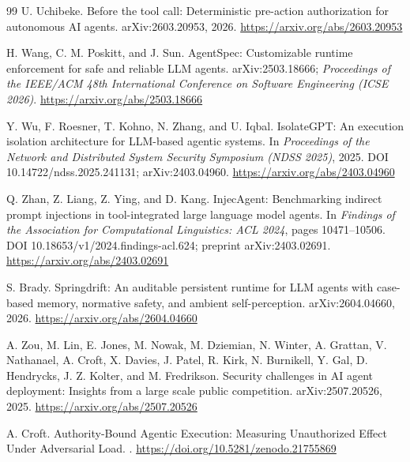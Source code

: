 \documentclass[11pt,letterpaper]{article}
\begin{document}
\begin{thebibliography}{99}
U. Uchibeke.
\newblock Before the tool call: Deterministic pre-action authorization for autonomous AI agents.
\newblock arXiv:2603.20953, 2026. \url{https://arxiv.org/abs/2603.20953}
\newblock [Preprint.]

H. Wang, C. M. Poskitt, and J. Sun.
\newblock AgentSpec: Customizable runtime enforcement for safe and reliable LLM agents.
\newblock arXiv:2503.18666; \emph{Proceedings of the IEEE/ACM 48th International Conference on Software Engineering (ICSE 2026)}.
\newblock \url{https://arxiv.org/abs/2503.18666}

Y. Wu, F. Roesner, T. Kohno, N. Zhang, and U. Iqbal.
\newblock IsolateGPT: An execution isolation architecture for LLM-based agentic systems.
\newblock In \emph{Proceedings of the Network and Distributed System Security Symposium (NDSS 2025)}, 2025.
\newblock DOI 10.14722/ndss.2025.241131; arXiv:2403.04960. \url{https://arxiv.org/abs/2403.04960}

Q. Zhan, Z. Liang, Z. Ying, and D. Kang.
\newblock InjecAgent: Benchmarking indirect prompt injections in tool-integrated large language model agents.
\newblock In \emph{Findings of the Association for Computational Linguistics: ACL 2024}, pages 10471--10506.
\newblock DOI 10.18653/v1/2024.findings-acl.624; preprint arXiv:2403.02691.
\newblock \url{https://arxiv.org/abs/2403.02691}

S. Brady.
\newblock Springdrift: An auditable persistent runtime for LLM agents with case-based memory, normative safety, and ambient self-perception.
\newblock arXiv:2604.04660, 2026. \url{https://arxiv.org/abs/2604.04660}
\newblock [Preprint.]

A. Zou, M. Lin, E. Jones, M. Nowak, M. Dziemian, N. Winter, A. Grattan, V. Nathanael, A. Croft, X. Davies, J. Patel, R. Kirk, N. Burnikell, Y. Gal, D. Hendrycks, J. Z. Kolter, and M. Fredrikson.
\newblock Security challenges in AI agent deployment: Insights from a large scale public competition.
\newblock arXiv:2507.20526, 2025. \url{https://arxiv.org/abs/2507.20526}
\newblock [Preprint.]

A. Croft.
\newblock Authority-Bound Agentic Execution: Measuring Unauthorized Effect Under Adversarial Load.
. \url{https://doi.org/10.5281/zenodo.21755869}

\end{thebibliography}
\end{document}

